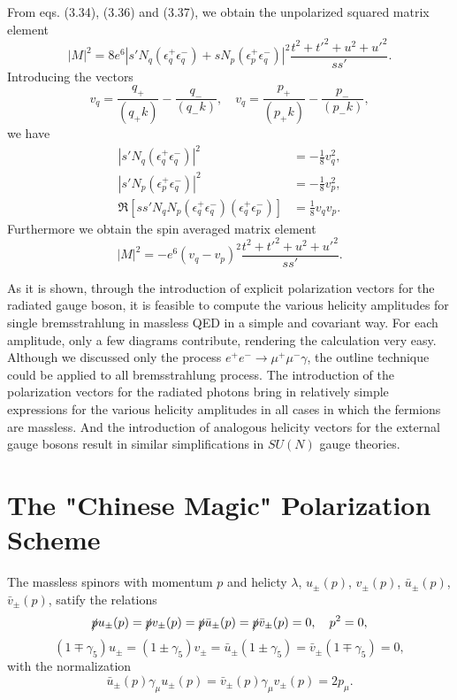 From eqs. (3.34), (3.36) and (3.37), we obtain the unpolarized squared matrix element
\begin{equation}
|M|^2=8e^6|s'N_q(\epsilon_q^+\epsilon_q^-)+sN_p(\epsilon_p^+\epsilon_q^-)|^2\frac{t^2+t'^2+u^2+u'^2}{ss'}.
\end{equation}
Introducing the vectors
\begin{equation}
v_q=\frac{q_+}{(q_+k)}-\frac{q_-}{(q_-k)},\quad v_q=\frac{p_+}{(p_+k)}-\frac{p_-}{(p_-k)},
\end{equation}
we have 
\begin{align}
|s'N_q(\epsilon_q^+\epsilon_q^-)|^2&=-\frac{1}{8}v_q^2,\nonumber\\
|s'N_p(\epsilon_p^+\epsilon_q^-)|^2&=-\frac{1}{8}v_p^2,\nonumber\\
\Re[ss'N_qN_p(\epsilon_q^+\epsilon_q^-)(\epsilon_q^+\epsilon_p^-)]&=\frac{1}{8}v_qv_p.
\end{align}
Furthermore we obtain the spin averaged matrix element
\begin{equation}
|M|^2=-e^6(v_q-v_p)^2\frac{t^2+t'^2+u^2+u'^2}{ss'}.
\end{equation}

As it is shown, through the introduction of explicit polarization vectors for the radiated gauge boson, it is feasible to compute the various helicity amplitudes for single bremsstrahlung in massless QED in a simple and covariant way. For each amplitude, only a few diagrams contribute, rendering the calculation very easy. Although we discussed only the process $e^+e^-\to\mu^+\mu^-\gamma$, the outline technique could be applied to all bremsstrahlung process. The introduction of the polarization vectors for the radiated photons bring in relatively simple expressions for the various helicity amplitudes in all cases in which the fermions are massless. And the introduction of analogous helicity vectors for the external gauge bosons result in similar simplifications in $SU(N)$ gauge theories.

\section{The "Chinese Magic" Polarization Scheme}

The massless spinors with momentum $p$ and helicty $\lambda$, 
$u_\pm(p)$, $v_\pm(p)$, $\bar{u}_\pm(p)$, $\bar{v}_\pm(p)$, satify the relations
\begin{equation}
\slashed{p}u_\pm(p)=\slashed{p}v_\pm(p)=\slashed{p}\bar{u}_\pm(p)=\slashed p\bar{v}_\pm(p)=0, \quad p^2=0,
\end{equation}
\begin{equation}
(1\mp\gamma_5)u_\pm=(1\pm\gamma_5)v_\pm=\bar{u}_\pm(1\pm\gamma_5)=\bar{v}_\pm(1\mp\gamma_5)=0,
\end{equation}
with the normalization
\begin{equation}
\bar{u}_\pm(p)\gamma_\mu u_\pm(p)=\bar{v}_\pm(p)\gamma_\mu v_\pm(p)=2p_\mu.
\end{equation}


